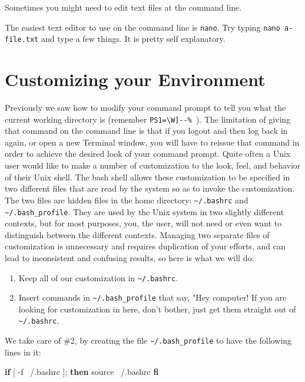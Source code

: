 \documentclass[]{krantz}
\makeatletter
\newenvironment{Shaded}{\begin{snugshade}}{\end{snugshade}}
\newcommand{\BuiltInTok}[1]{#1}
\newcommand{\KeywordTok}[1]{\textcolor[rgb]{0.27,0.27,0.27}{\textbf{#1}}}
\newcommand{\NormalTok}[1]{#1}
\newcommand{\OtherTok}[1]{\textcolor[rgb]{0.37,0.37,0.37}{#1}}
\providecommand{\tightlist}{%
  \setlength{\itemsep}{0pt}\setlength{\parskip}{0pt}}
\newenvironment{kframe}{%
\medskip{}
\setlength{\fboxsep}{.8em}
 \def\at@end@of@kframe{}%
 \ifinner\ifhmode%
  \def\at@end@of@kframe{\end{minipage}}%
  \begin{minipage}{\columnwidth}%
 \fi\fi%
 \def\FrameCommand##1{\hskip\@totalleftmargin \hskip-\fboxsep
 \colorbox{shadecolor}{##1}\hskip-\fboxsep
     \hskip-\linewidth \hskip-\@totalleftmargin \hskip\columnwidth}%
 \MakeFramed {\advance\hsize-\width
   \@totalleftmargin\z@ \linewidth\hsize
   \@setminipage}}%
 {\par\unskip\endMakeFramed%
 \at@end@of@kframe}
\renewenvironment{Shaded}{\begin{kframe}}{\end{kframe}}
\makeatother
\begin{document}
Sometimes you might need to edit text files at the command line.

The easiest text editor to use on the command line is \texttt{nano}.
Try typing \texttt{nano\ a-file.txt} and type a few things. It is
pretty self explanatory.

\hypertarget{unix-env}{%
\section{Customizing your Environment}\label{unix-env}}

Previously we saw how to modify your command prompt to tell you what the current
working directory is (remember \texttt{PS1=\textquotesingle{}{[}\textbackslash{}W{]}-\/-\%\ \textquotesingle{}}). The limitation of giving that
command on the command line is that if you logout and then log back in again, or open
a new Terminal window, you will have to reissue that command in order to achieve
the desired look of your command prompt. Quite often a Unix user would like to make
a number of customization to the look, feel, and behavior of their Unix shell.
The bash shell allows these customization to be specified in two different files that
are read by the system so as to invoke the customization. The two files are hidden files
in the home directory: \texttt{\textasciitilde{}/.bashrc} and \texttt{\textasciitilde{}/.bash\_profile}. They are used by the Unix system
in two slightly different contexts, but for most purposes, you, the user, will not need or
even want to distinguish between the different contexts. Managing two separate files
of customization is unnecessary and requires duplication of your efforts, and can lead to inconsistent
and confusing results, so here is what we will do:

\begin{enumerate}
\def\labelenumi{\arabic{enumi}.}
\tightlist
\item
  Keep all of our customization in \texttt{\textasciitilde{}/.bashrc}.
\item
  Insert commands in \texttt{\textasciitilde{}/.bash\_profile} that say, "Hey computer! If you are looking
  for customization in here, don't bother, just get them straight out of \texttt{\textasciitilde{}/.bashrc}.
\end{enumerate}

We take care of \#2, by creating the file \texttt{\textasciitilde{}/.bash\_profile} to have the following
lines in it:

\begin{Shaded}
\begin{Highlighting}[]

\KeywordTok{if}\BuiltInTok{ [} \OtherTok{-f}\NormalTok{ ~/.bashrc}\BuiltInTok{ ]}\NormalTok{; }\KeywordTok{then}
    \BuiltInTok{source}\NormalTok{ ~/.bashrc}
\KeywordTok{fi}
\end{Highlighting}
\end{Shaded}
\end{document}
